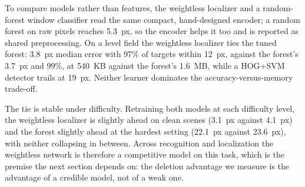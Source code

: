 To compare models rather than features, the weightless localizer and a random-forest window classifier read the same compact, hand-designed encoder; a random forest on raw pixels reaches 5.3~px, so the encoder helps it too and is reported as shared preprocessing. On a level field the weightless localizer ties the tuned forest: 3.8~px median error with 97\% of targets within 12~px, against the forest's 3.7~px and 99\%, at 540~KB against the forest's 1.6~MB, while a HOG+SVM detector trails at 19~px. Neither learner dominates the accuracy-versus-memory trade-off.

The tie is stable under difficulty. Retraining both models at each difficulty level, the weightless localizer is slightly ahead on clean scenes (3.1~px against 4.1~px) and the forest slightly ahead at the hardest setting (22.1~px against 23.6~px), with neither collapsing in between. Across recognition and localization the weightless network is therefore a competitive model on this task, which is the premise the next section depends on: the deletion advantage we measure is the advantage of a credible model, not of a weak one.

